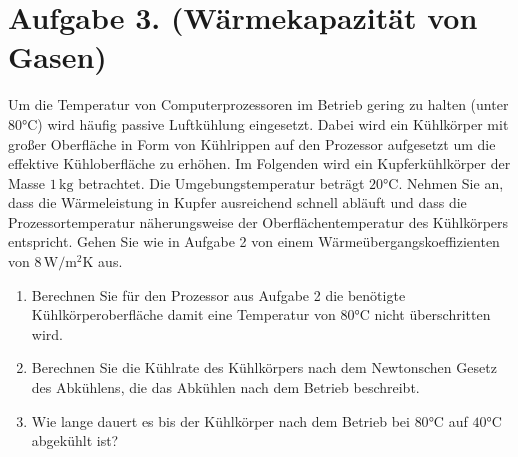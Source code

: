 \documentclass[german,12pt]{homework}
\begin{document}
    \section*{Aufgabe 3. (Wärmekapazität von Gasen)}

    \begin{problem}
        Um die Temperatur von Computerprozessoren im Betrieb gering zu halten
        (unter \(80\si{\degreeCelsius}\)) wird häufig passive Luftkühlung
        eingesetzt. Dabei wird ein Kühlkörper mit großer Oberfläche in Form von
        Kühlrippen auf den Prozessor aufgesetzt um die effektive Kühloberfläche
        zu erhöhen. Im Folgenden wird ein Kupferkühlkörper der Masse
        \(1\,\si{\kilogram}\) betrachtet. Die Umgebungstemperatur beträgt
        \(20\si{\degreeCelsius}\). Nehmen Sie an, dass die Wärmeleistung in
        Kupfer ausreichend schnell abläuft und dass die Prozessortemperatur
        näherungsweise der Oberflächentemperatur des Kühlkörpers entspricht.
        Gehen Sie wie in Aufgabe 2 von einem Wärmeübergangskoeffizienten von
        \(8\,\si{\watt\per\meter\squared\kelvin}\) aus.
        \begin{enumerate}
            \item Berechnen Sie für den Prozessor aus Aufgabe 2 die benötigte
            Kühlkörperoberfläche damit eine Temperatur von
            \(80\si{\degreeCelsius}\) nicht überschritten wird.
            \item Berechnen Sie die Kühlrate des Kühlkörpers nach dem
            Newtonschen Gesetz des Abkühlens, die das Abkühlen nach dem Betrieb
            beschreibt.
            \item Wie lange dauert es bis der Kühlkörper nach dem Betrieb bei
            \(80\si{\degreeCelsius}\) auf \(40\si{\degreeCelsius}\) abgekühlt
            ist?
        \end{enumerate}
    \end{problem}
\end{document}
